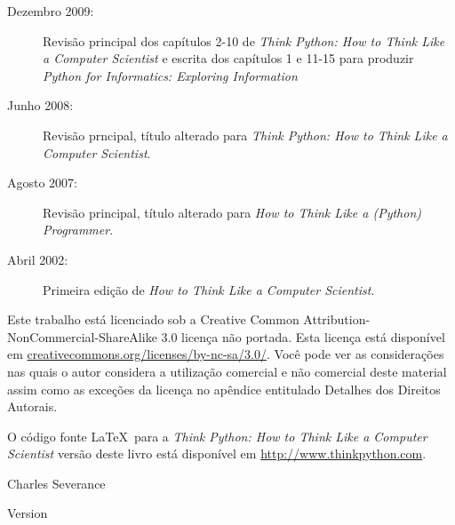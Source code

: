 \begin{latexonly}
{\begin{description}
\item[Dezembro 2009:] Revisão principal dos capítulos 2-10 de
\emph{Think Python: How to Think Like
a Computer Scientist}
e escrita dos capítulos 1 e 11-15 para
produzir 
\emph{Python for Informatics: Exploring Information}

\item[Junho 2008:] Revisão prncipal, título alterado para
\emph{Think Python: How to Think Like
a Computer Scientist}.

\item[Agosto 2007:] Revisão principal, título alterado para
\emph{How to Think Like a (Python) Programmer}.

\item[Abril 2002:] Primeira edição de \emph{How to Think Like
a Computer Scientist}.

\end{description}

\vspace{0.2in}

Este trabalho está licenciado sob a 
Creative Common
Attribution-NonCommercial-ShareAlike 3.0 licença não portada.
Esta licença está
disponível em
\url{creativecommons.org/licenses/by-nc-sa/3.0/}.  Você pode 
ver as considerações nas quais o autor considera a utilização comercial e não comercial
deste material assim como as exceções da licença
no apêndice entitulado Detalhes dos Direitos Autorais.

O código fonte \LaTeX\ para a 
\emph{Think Python: How to Think Like
a Computer Scientist}
versão deste livro está disponível em
\url{http://www.thinkpython.com}.

\vspace{0.2in}

} %

\end{latexonly}



\begin{htmlonly}


{\Large \thetitle}

{\large 
Charles Severance}

Version \theversion

\setcounter{chapter}{-1}

\end{htmlonly}
